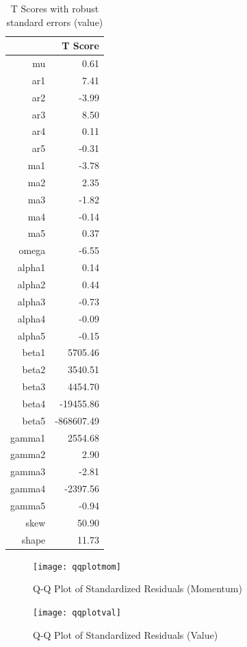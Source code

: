 \documentclass[12pt,letterpaper]{memoir}
\begin{document}
\begin{table}[ht]
\centering
\caption{T Scores with robust standard errors (value)}
\begin{tabular}{rr}
  \hline
 & T Score \\ 
  \hline
mu & 0.61 \\ 
  ar1 & 7.41 \\ 
  ar2 & -3.99 \\ 
  ar3 & 8.50 \\ 
  ar4 & 0.11 \\ 
  ar5 & -0.31 \\ 
  ma1 & -3.78 \\ 
  ma2 & 2.35 \\ 
  ma3 & -1.82 \\ 
  ma4 & -0.14 \\ 
  ma5 & 0.37 \\ 
  omega & -6.55 \\ 
  alpha1 & 0.14 \\ 
  alpha2 & 0.44 \\ 
  alpha3 & -0.73 \\ 
  alpha4 & -0.09 \\ 
  alpha5 & -0.15 \\ 
  beta1 & 5705.46 \\ 
  beta2 & 3540.51 \\ 
  beta3 & 4454.70 \\ 
  beta4 & -19455.86 \\ 
  beta5 & -868607.49 \\ 
  gamma1 & 2554.68 \\ 
  gamma2 & 2.90 \\ 
  gamma3 & -2.81 \\ 
  gamma4 & -2397.56 \\ 
  gamma5 & -0.94 \\ 
  skew & 50.90 \\ 
  shape & 11.73 \\ 
   \hline
\end{tabular}
\end{table}
\begin{figure}
\texttt{[image: qqplotmom]}
\caption{Q-Q Plot of Standardized Residuals (Momentum)}
\end{figure}
\begin{figure}
\texttt{[image: qqplotval]}
\caption{Q-Q Plot of Standardized Residuals (Value)}
\end{figure}
\end{document}
